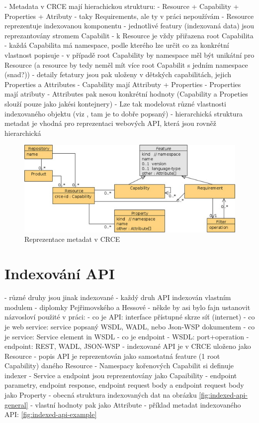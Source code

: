 \documentclass[czech,DP]{thesiskiv}
\begin{document}
 - Metadata v CRCE mají hierachickou strukturu:
	 - Resource + Capability + Properties + Atributy
	 - taky Requirements, ale ty v práci nepoužívám
	 - Resource reprezentuje indexovanou komponentu
	 - jednotlivé featury (indexovaná data) jsou reprezantovány stromem Capabilit
	 	- k Resource je vždy přiřazena root Capabilita
	 	- každá Capabilita má namespace, podle kterého lze určit co za konkrétní vlastnost popisuje
	 	- v případě root Capability by namespace měl být unikátní pro Resource (a resource by tedy neměl mít více root Capabilit s jedním namespace (snad?))
	 	- detaily fetatury jsou pak uloženy v dětských capabilitách, jejich Properties a Attributes
 - Capability mají Attributy + Properties
 - Properties mají atributy
 - Attributes pak nesou konkrétní hodnoty (Capability a Propeties slouží pouze jako jakési kontejnery)
 - Lze tak modelovat různé vlastnosti indexovaného objektu (viz \cite{brada2015repository}, tam je to dobře popsaný)
 - hierarchická struktura metadat je vhodná pro reprezentaci webových API, která jsou rovněž hierarchická
 
 \begin{figure}[h]
 	\centering
 	\includegraphics{resource-uml}
 	\caption{Reprezentace metadat v CRCE}
 	\label{fig:crce-resource-uml}
 \end{figure}

\section{Indexování API}

- různé druhy jsou jinak indexované
- každý druh API indexován vlastním modulem - diplomky Pejřimovského \cite{pejrimovsky2015ws} a Hessové \cite{hessova2015rest}
- někde by asi bylo fajn ustanovit názvosloví použité v práci:
	- co je API: interface přístupné skrze síť (internet)
	- co je web service: service popsaný WSDL, WADL, nebo Json-WSP dokumentem
	- co je service: Service element in WSDL
	- co je endpoint
		- WSDL: port+operation
		- endpoint: REST, WADL, JSON-WSP
- indexované API je v CRCE uloženo jako Resource		
- popis API je reprezentován jako samostatná feature (1 root Capability) daného Resource
	- Namespacy kořenových Capabilit si definuje indexer
- Service a endpoint jsou reprezentovány jako Capaibility
- endpoint parametry, endpoint response, endpoint request body a endpoint request body jako Property
	- obecná struktura indexovaných dat na obrázku \ref{fig:indexed-api-general}
- vlastní hodnoty pak jako Attribute
- příklad metadat indexovaného API: \ref{fig:indexed-api-example}
\end{document}
